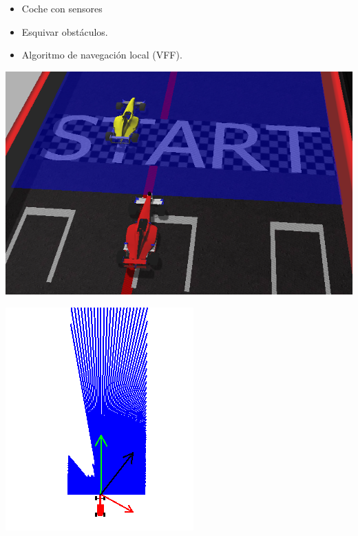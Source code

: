 \documentclass[notes,slidesec,a4]{seminar}
\begin{document}
\begin{hslide}
	\begin{itemize}
		\item Coche con sensores 
		\item Esquivar obstáculos.
		\item Algoritmo de navegación local (VFF).
	\end{itemize}
	\begin{minipage}[t]{0.55\textwidth}
		\includegraphics[width=\textwidth]{vff-gazebo.png}
	\end{minipage}
	\begin{minipage}[t]{0.25\textwidth}
		\includegraphics[width=\textwidth]{vff-gui.png}
	\end{minipage}
\end{hslide}
\end{document}
